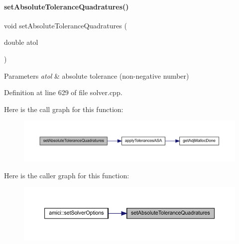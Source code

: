 \paragraph{\texorpdfstring{setAbsoluteToleranceQuadratures()}{setAbsoluteToleranceQuadratures()}}
{\footnotesize\ttfamily void set\+Absolute\+Tolerance\+Quadratures (\begin{DoxyParamCaption}\item[{double}]{atol }\end{DoxyParamCaption})}


\begin{DoxyParams}{Parameters}
{\em atol} & absolute tolerance (non-\/negative number) \\
\hline
\end{DoxyParams}


Definition at line 629 of file solver.\+cpp.

Here is the call graph for this function\+:
\nopagebreak
\begin{figure}[H]
\begin{center}
\leavevmode
\includegraphics[width=350pt]{classamici_1_1_solver_af425163c5d98c472d17e080da4ee3b78_cgraph}
\end{center}
\end{figure}
Here is the caller graph for this function\+:
\nopagebreak
\begin{figure}[H]
\begin{center}
\leavevmode
\includegraphics[width=350pt]{classamici_1_1_solver_af425163c5d98c472d17e080da4ee3b78_icgraph}
\end{center}
\end{figure}
\mbox{\label{classamici_1_1_solver_ae598de1a48d3c4af1d08b8436d481e11}} 
